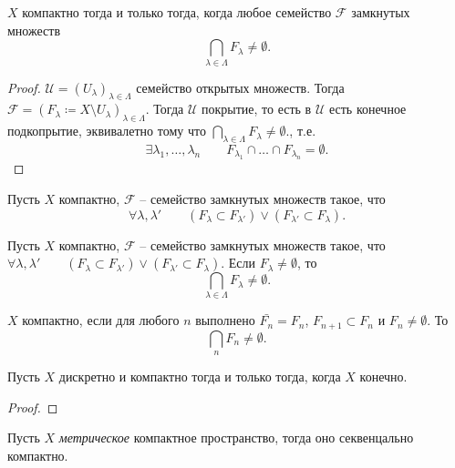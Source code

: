 \begin{proposition}
    $X$ компактно тогда и только тогда, когда любое семейство $\mathcal F$ замкнутых множеств \[\bigcap_{\lambda \in \Lambda} F_\lambda \neq \emptyset.\] 
\end{proposition}
\begin{proof}
    $\mathcal U = (U_\lambda)_{\lambda\in \Lambda}$ семейство открытых множеств. Тогда $\mathcal F = (F_{\lambda}\coloneq X \setminus U_{\lambda})_{\lambda \in \Lambda}.$ Тогда $\mathcal U$ покрытие, то есть в $\mathcal U$ есть конечное подкопрытие, эквивалетно тому что $\bigcap_{\lambda \in \Lambda} F_\lambda \neq \emptyset.$, т.е. \[\exists \lambda_1, \ldots, \lambda_n\qquad F_{\lambda_1} \cap \ldots \cap F_{\lambda_n} = \emptyset.\]
\end{proof}
\begin{corollary}
    Пусть $X$ компактно, $\mathcal F$ -- семейство замкнутых множеств такое, что \[
    \forall \lambda, \lambda' \qquad (F_\lambda \subset F_{\lambda'})\lor(F_{\lambda'} \subset F_\lambda).
    \]
\end{corollary}
\begin{corollary}
    Пусть $X$ компактно, $\mathcal F$ -- семейство замкнутых множеств такое, что \(
    \forall \lambda, \lambda' \qquad (F_\lambda \subset F_{\lambda'})\lor(F_{\lambda'} \subset F_\lambda).
    \)
    Если $F_\lambda \neq \emptyset$, то \[\bigcap_{\lambda\in\Lambda }F_\lambda \neq \emptyset.\]
\end{corollary}
\begin{corollary}
    $X$ компактно, если для любого $n$ выполнено $\bar{F_n} = F_n$, $F_{n+1} \subset F_n$ и $F_n \neq \emptyset.$ То \[\bigcap_{n}F_n \neq \emptyset.\]
\end{corollary}

\begin{proposition}
    Пусть $X$ дискретно и компактно тогда и только тогда, когда $X$ конечно.
\end{proposition}
\begin{proof}
\end{proof}

\begin{theorem}
    Пусть $X$ \emph{метрическое} компактное пространство, тогда оно секвенцально компактно.
\end{theorem}

